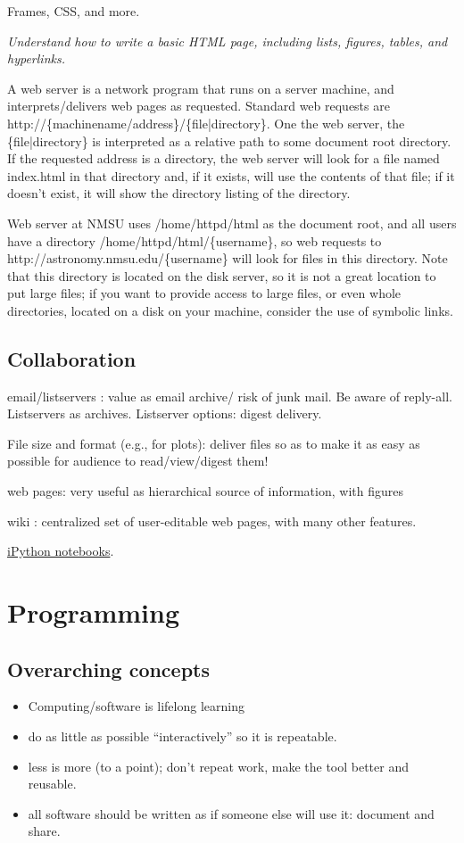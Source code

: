 \documentclass{article}
\newcommand{\test}[1]{%
    \begin{center}
        \colorbox{hl}{\parbox{0.9\textwidth}{\emph{\centering #1}}}
    \end{center}}
\begin{document}
Frames, CSS, and more.

\test{Understand how to write a basic HTML page, including lists,
figures, tables, and hyperlinks.}

A web server is a network program that runs on a server machine, and
interprets/delivers web pages as requested. Standard web requests are
http://\{machinename/address\}/\{file|directory\}. One the web server, the
\{file|directory\} is interpreted as a relative path to some document
root directory. If the requested address is a directory, the web
server will look for a file named index.html in that directory and, if
it exists, will use the contents of that file; if it doesn't exist, it
will show the directory listing of the directory.

Web server at NMSU uses /home/httpd/html as the document root, and all
users have a directory /home/httpd/html/\{username\}, so web requests to
http://astronomy.nmsu.edu/\{username\} will look for files in this
directory. Note that this directory is located on the disk server, so
it is not a great location to put large files; if you want to provide
access to large files, or even whole directories, located on a disk on
your machine, consider the use of symbolic links.


\subsection{Collaboration}

email/listservers : value as email archive/ risk of junk mail. Be
aware of reply-all. Listservers as archives. Listserver options:
digest delivery.

File size and format (e.g., for plots): deliver files so as to make it
as easy as possible for audience to read/view/digest them!

web pages: very useful as hierarchical source of information, with
figures

wiki : centralized set of user-editable web pages, with many other
features\@.

\href{http://astronomy.nmsu.edu/holtz/a575/ipynb.html}
{iPython notebooks}.

\newpage
\section{Programming}
\subsection{Overarching concepts}
\begin{itemize}
    \item Computing/software is lifelong learning
    \item do as little as possible ``interactively'' so it is
        repeatable.
    \item less is more (to a point); don't repeat work, make the tool
        better and reusable.
    \item all software should be written as if someone else will use
        it: document and share.
\end{itemize}
\end{document}
